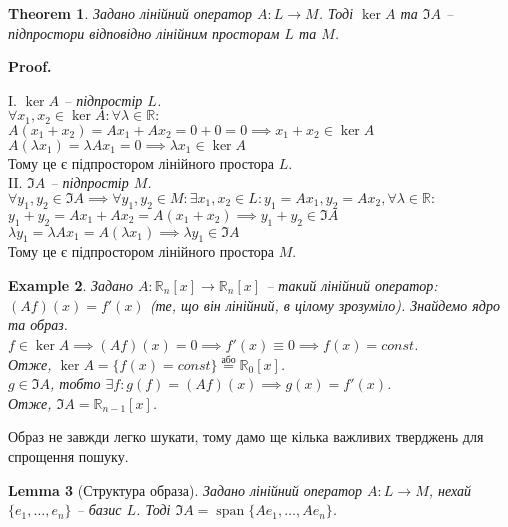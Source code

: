 \documentclass[a4paper, 10pt]{article}
\makeatletter
\theoremstyle{theoremdd}
\newtheorem{theorem}{Theorem}[subsection]
\newtheorem{example}[theorem]{Example}
\newtheorem{lemma}[theorem]{Lemma}
\DeclareMathOperator{\linspan}{span}
\renewenvironment{proof}[1][Proof.\\]{\par
\pushQED{\hfill \qed}%
\normalfont \topsep6\p@\@plus6\p@\relax
\trivlist
\item\relax
{\bfseries
#1\@addpunct{.}}\hspace\labelsep\ignorespaces
}{%
\popQED\endtrivlist\@endpefalse
}
\makeatother
\begin{document}
	\begin{theorem}
	Задано лінійний оператор $A \colon L \to M$. Тоді $\ker A$ та $\Im A$ -- підпростори відповідно лінійним просторам $L$ та $M$.
	\end{theorem}
	
	\begin{proof}
	I. \textit{$\ker A$ -- підпростір $L$.}\\
	$\forall x_1, x_2 \in \ker A: \forall \lambda \in \mathbb{R}:$\\
	$A(x_1+x_2)=Ax_1+Ax_2 = 0 + 0 = 0 \implies x_1+x_2 \in \ker A$\\
	$A(\lambda x_1) = \lambda Ax_1 = 0 \implies \lambda x_1 \in \ker A$\\
	Тому це є підпростором лінійного простора $L$.
	\bigskip \\
	II. \textit{$\Im A$ -- підпростір $M$.}\\
	$\forall y_1, y_2 \in \Im A \implies \forall y_1, y_2 \in M: \exists x_1, x_2 \in L: y_1 = Ax_1, y_2 = Ax_2, \forall \lambda \in \mathbb{R}:$\\
	$y_1 + y_2 = Ax_1 + Ax_2 = A(x_1+x_2) \implies y_1+y_2 \in \Im A$\\
	$\lambda y_1 = \lambda Ax_1 = A(\lambda x_1) \implies \lambda y_1 \in \Im A$\\
	Тому це є підпростором лінійного простора $M$.
	\end{proof}
	
	\begin{example}
	Задано $A \colon \mathbb{R}_n[x] \to \mathbb{R}_n[x]$ -- такий лінійний оператор: \quad $(Af)(x) = f'(x)$ (те, що він лінійний, в цілому зрозуміло). Знайдемо ядро та образ.\\
	$f \in \ker A \implies (Af)(x) = 0 \implies f'(x) \equiv 0 \implies f(x) = const$. \\
	Отже, $\ker A = \{ f(x) = const\} \overset{\textrm{або}}{=} \mathbb{R}_0[x]$.
	\bigskip \\
	$g \in \Im A$, тобто $\exists f: g(f) = (Af)(x) \implies g(x) = f'(x)$. \\
	Отже, $\Im A = \mathbb{R}_{n-1}[x]$.
	\end{example}

\noindent
	Образ не завжди легко шукати, тому дамо ще кілька важливих тверджень для спрощення пошуку.
	\begin{lemma}[Структура образа]
	Задано лінійний оператор $A \colon L \to M$, нехай $\{e_1,\dots, e_n\}$ -- базис $L$. Тоді $\Im A = \linspan \{Ae_1,\dots, Ae_n\}$.
	\end{lemma}
	
\end{document}
